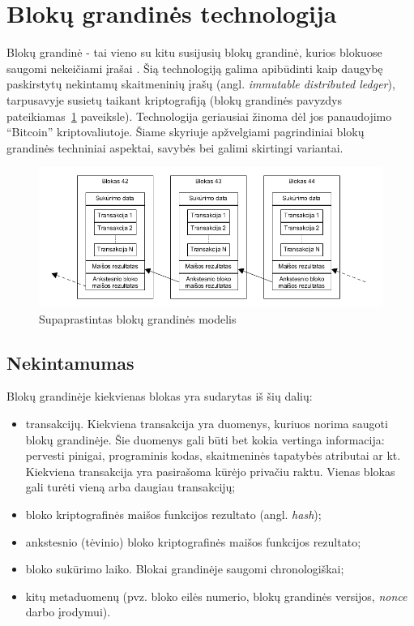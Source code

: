 \section{Blokų grandinės technologija} \label{section:blockchainOverview}

Blokų grandinė - tai vieno su kitu susijusių blokų grandinė, kurios blokuose saugomi
nekeičiami įrašai \cite{SatoshiNakamoto}. Šią technologiją galima apibūdinti kaip daugybę paskirstytų nekintamų skaitmeninių įrašų 
(angl. \textit{immutable distributed ledger}), tarpusavyje susietų taikant kriptografiją (blokų grandinės pavyzdys pateikiamas\hypertarget{fig:blockchain}{~\ref{fig:blockchain}} paveiksle). Technologija geriausiai žinoma dėl jos panaudojimo \enquote{Bitcoin} kriptovaliutoje.
Šiame skyriuje apžvelgiami pagrindiniai blokų grandinės techniniai aspektai, savybės bei galimi skirtingi variantai.

\begin{figure}[H]
    \centering
    \includegraphics[scale=0.6]{img/blockchain}
    \caption{Supaprastintas blokų grandinės modelis}
    \label{fig:blockchain}
\end{figure}

\subsection{Nekintamumas}

Blokų grandinėje kiekvienas blokas yra sudarytas iš šių dalių:

\begin{itemize}
    \item transakcijų. Kiekviena transakcija yra duomenys, kuriuos norima saugoti blokų grandinėje. Šie duomenys gali būti bet kokia vertinga informacija:
    pervesti pinigai, programinis kodas, skaitmeninės tapatybės atributai ar kt. Kiekviena transakcija yra pasirašoma
    kūrėjo privačiu raktu. Vienas blokas gali turėti vieną arba daugiau transakcijų;
    \item bloko kriptografinės maišos funkcijos rezultato (angl. \textit{hash});
    \item ankstesnio (tėvinio) bloko kriptografinės maišos funkcijos rezultato;
    \item bloko sukūrimo laiko. Blokai grandinėje saugomi chronologiškai;
    \item kitų metaduomenų (pvz. bloko eilės numerio, blokų grandinės versijos, \textit{nonce} darbo įrodymui).
\end{itemize}

